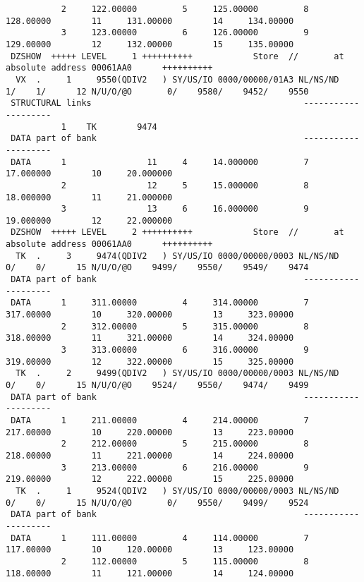\begin{Listing}
\begin{verbatim}
           2     122.00000         5     125.00000         8     128.00000        11     131.00000        14     134.00000
           3     123.00000         6     126.00000         9     129.00000        12     132.00000        15     135.00000
 DZSHOW  +++++ LEVEL     1 ++++++++++            Store  //       at absolute address 00061AA0      ++++++++++
  VX  .     1     9550(QDIV2   ) SY/US/IO 0000/00000/01A3 NL/NS/ND    1/    1/      12 N/U/O/@O       0/    9580/    9452/    9550
 STRUCTURAL links                                          --------------------
           1    TK        9474
 DATA part of bank                                         --------------------
 DATA      1                11     4     14.000000         7     17.000000        10     20.000000
           2                12     5     15.000000         8     18.000000        11     21.000000
           3                13     6     16.000000         9     19.000000        12     22.000000
 DZSHOW  +++++ LEVEL     2 ++++++++++            Store  //       at absolute address 00061AA0      ++++++++++
  TK  .     3     9474(QDIV2   ) SY/US/IO 0000/00000/0003 NL/NS/ND    0/    0/      15 N/U/O/@O    9499/    9550/    9549/    9474
 DATA part of bank                                         --------------------
 DATA      1     311.00000         4     314.00000         7     317.00000        10     320.00000        13     323.00000
           2     312.00000         5     315.00000         8     318.00000        11     321.00000        14     324.00000
           3     313.00000         6     316.00000         9     319.00000        12     322.00000        15     325.00000
  TK  .     2     9499(QDIV2   ) SY/US/IO 0000/00000/0003 NL/NS/ND    0/    0/      15 N/U/O/@O    9524/    9550/    9474/    9499
 DATA part of bank                                         --------------------
 DATA      1     211.00000         4     214.00000         7     217.00000        10     220.00000        13     223.00000
           2     212.00000         5     215.00000         8     218.00000        11     221.00000        14     224.00000
           3     213.00000         6     216.00000         9     219.00000        12     222.00000        15     225.00000
  TK  .     1     9524(QDIV2   ) SY/US/IO 0000/00000/0003 NL/NS/ND    0/    0/      15 N/U/O/@O       0/    9550/    9499/    9524
 DATA part of bank                                         --------------------
 DATA      1     111.00000         4     114.00000         7     117.00000        10     120.00000        13     123.00000
           2     112.00000         5     115.00000         8     118.00000        11     121.00000        14     124.00000

\end{verbatim}
\end{Listing}
